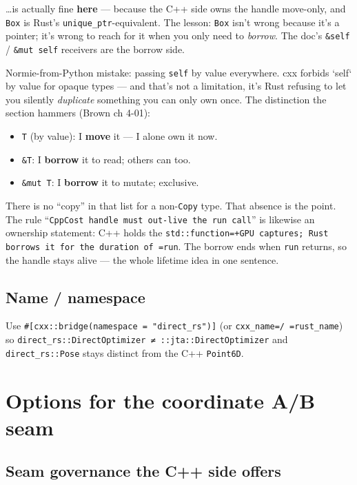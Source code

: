 \documentclass[11pt]{article}
\begin{document}
\ldots{}is actually fine \textbf{here} — because the C++ side owns the handle move-only, and
\texttt{Box} is Rust's \texttt{unique\_ptr}-equivalent. The lesson: \texttt{Box} isn't wrong because
it's a pointer; it's wrong to reach for it when you only need to \emph{borrow}. The
doc's \texttt{\&self} / \texttt{\&mut self} receivers are the borrow side.

Normie-from-Python mistake: passing \texttt{self} by value everywhere. cxx forbids
`self` by value for opaque types — and that's not a limitation, it's Rust
refusing to let you silently \emph{duplicate} something you can only own once. The
distinction the section hammers (Brown ch 4-01):

\begin{itemize}
\item \texttt{T} (by value): I \textbf{move} it — I alone own it now.
\item \texttt{\&T}: I \textbf{borrow} it to read; others can too.
\item \texttt{\&mut T}: I \textbf{borrow} it to mutate; exclusive.
\end{itemize}

There is no ``copy'' in that list for a non-\texttt{Copy} type. That absence is the
point. The rule ``\texttt{CppCost handle must out-live the run call}'' is likewise an
ownership statement: C++ holds the \texttt{std::function=+GPU captures; Rust borrows
it for the duration of =run}. The borrow ends when \texttt{run} returns, so the handle
stays alive — the whole lifetime idea in one sentence.
\subsection{Name / namespace}
\label{sec:org624bab5}

Use \texttt{\#[cxx::bridge(namespace = "direct\_rs")]} (or \texttt{cxx\_name=/ =rust\_name})
so \texttt{direct\_rs::DirectOptimizer ≠ ::jta::DirectOptimizer} and
\texttt{direct\_rs::Pose} stays distinct from the C++ \texttt{Point6D}.
\section{Options for the coordinate A/B seam}
\label{sec:org0944d4b}

\subsection{Seam governance the C++ side offers}
\label{sec:orgc27d162}
\end{document}
